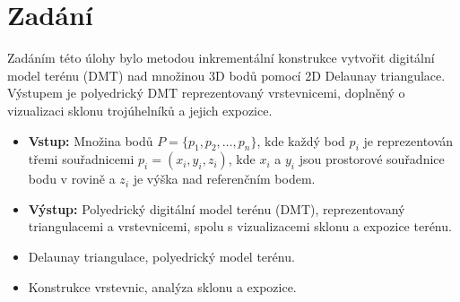 \section{Zadání}

Zadáním této úlohy bylo metodou inkrementální konstrukce vytvořit digitální model terénu (DMT) nad množinou 3D bodů pomocí 2D Delaunay triangulace. Výstupem je polyedrický DMT reprezentovaný vrstevnicemi, doplněný o vizualizaci sklonu trojúhelníků a jejich expozice.

\begin{itemize}
    \item \textbf{Vstup:} Množina bodů \( P = \{ p_1, p_2, \dots, p_n \} \), kde každý bod \( p_i \) je reprezentován třemi souřadnicemi \( p_i = (x_i, y_i, z_i) \), kde \( x_i \) a \( y_i \) jsou prostorové souřadnice bodu v rovině a \( z_i \) je výška nad referenčním bodem.
    \item \textbf{Výstup:} Polyedrický digitální model terénu (DMT), reprezentovaný triangulacemi a vrstevnicemi, spolu s vizualizacemi sklonu a expozice terénu.
\end{itemize}

\begin{itemize}
    \item Delaunay triangulace, polyedrický model terénu.
    \item Konstrukce vrstevnic, analýza sklonu a expozice.
\end{itemize}